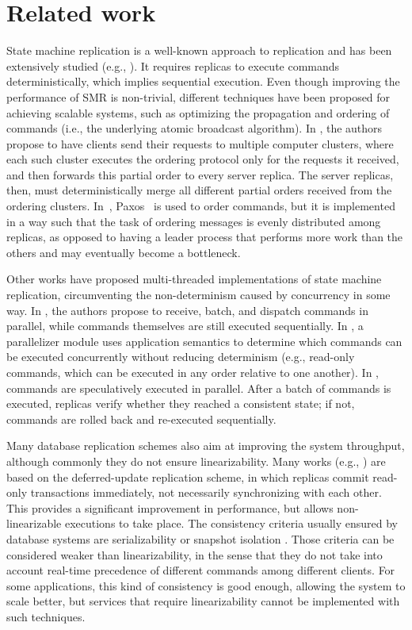 \section{Related work}
\label{sec:rw}

State machine replication is a well-known approach to replication and has been extensively studied (e.g., \cite{kapritsos2012eve, kotla2004htbft, Lam78, santos2013htsmr, Sch90}).
It requires replicas to execute commands deterministically, which implies sequential execution.
Even though improving the performance of SMR is non-trivial, different techniques have been proposed for achieving scalable systems, such as optimizing the propagation and ordering of commands (i.e., the underlying atomic broadcast algorithm).
In \cite{kapritsos2010scalable}, the authors propose to have clients send their requests to multiple computer clusters, where each such cluster executes the ordering protocol only for the requests it received, and then forwards this partial order to every server replica.
The server replicas, then, must deterministically merge all different partial orders received from the ordering clusters.
In~\cite{biely2012spaxos}, Paxos~\cite{Lamport:1998ea} is used to order commands, but it is implemented in a way such that the task of ordering messages is evenly distributed among replicas, as opposed to having a leader process that performs more work than the others and may eventually become a bottleneck. 

Other works have proposed multi-threaded implementations of state machine replication, circumventing the non-determinism caused by concurrency in some way. 
In \cite{santos2013htsmr}, the authors propose to receive, batch, and dispatch commands in parallel, while commands themselves are still executed sequentially.
In \cite{kotla2004htbft}, a parallelizer module uses application semantics to determine which commands can be executed concurrently without reducing determinism (e.g., read-only commands, which can be executed in any order relative to one another).
In \cite{kapritsos2012eve}, commands are speculatively executed in parallel.
After a batch of commands is executed, replicas verify whether they reached a consistent state; if not, commands are rolled back and re-executed sequentially. 

Many database replication schemes also aim at improving the system throughput, although commonly they do not ensure linearizability. Many works (e.g., \cite{chundi96dur, kobus2013hybrid, sciascia2012sdur, SousaOMP01}) are based on the deferred-update replication scheme, in which replicas commit read-only transactions immediately, not necessarily synchronizing with each other. This provides a significant improvement in performance, but allows non-linearizable executions to take place. The consistency criteria usually ensured by database systems are serializability \cite{BHG87} or snapshot isolation \cite{LinKJPA09}. Those criteria can be considered weaker than linearizability, in the sense that they do not take into account real-time precedence of different commands among different clients. For some applications, this kind of consistency is good enough, allowing the system to scale better, but services that require linearizability cannot be implemented with such techniques.

